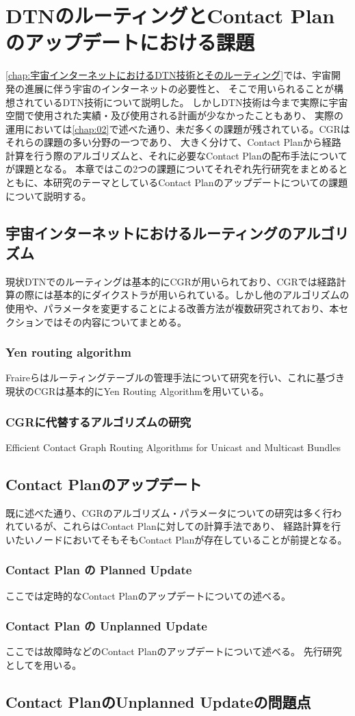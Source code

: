 \chapter{DTNのルーティングとContact Planのアップデートにおける課題}

\label{chap:03}
\ref{chap:宇宙インターネットにおけるDTN技術とそのルーティング}では、宇宙開発の進展に伴う宇宙のインターネットの必要性と、
そこで用いられることが構想されているDTN技術について説明した。
しかしDTN技術は今まで実際に宇宙空間で使用された実績・及び使用される計画が少なかったこともあり、
実際の運用においては\ref{chap:02}で述べた通り、未だ多くの課題が残されている。CGRはそれらの課題の多い分野の一つであり、
大きく分けて、Contact Planから経路計算を行う際のアルゴリズムと、それに必要なContact Planの配布手法についてが課題となる。
本章ではこの2つの課題についてそれぞれ先行研究をまとめるとともに、本研究のテーマとしているContact Planのアップデートについての課題について説明する。

\section{宇宙インターネットにおけるルーティングのアルゴリズム}
現状DTNでのルーティングは基本的にCGRが用いられており、CGRでは経路計算の際には基本的にダイクストラが用いられている。しかし他のアルゴリズムの使用や、パラメータを変更することによる改善方法が複数研究されており、本セクションではその内容についてまとめる。
\subsection{Yen routing algorithm}
Fraireらはルーティングテーブルの管理手法について研究を行い、これに基づき現状のCGRは基本的にYen Routing Algorithmを用いている。\cite{FRAIRE2018}

\subsection{CGRに代替するアルゴリズムの研究}
Efficient Contact Graph Routing Algorithms for Unicast and Multicast Bundles\cite{DeJonckere2019}
\section{Contact Planのアップデート}
既に述べた通り、CGRのアルゴリズム・パラメータについての研究は多く行われているが、これらはContact Planに対しての計算手法であり、
経路計算を行いたいノードにおいてそもそもContact Planが存在していることが前提となる。
\subsection{Contact Plan の Planned Update}
ここでは定時的なContact Planのアップデートについての述べる。
\subsection{Contact Plan の Unplanned Update}
ここでは故障時などのContact Planのアップデートについて述べる。
先行研究として\cite{Bezirgiannidis2013}を用いる。
\section{Contact PlanのUnplanned Updateの問題点}
